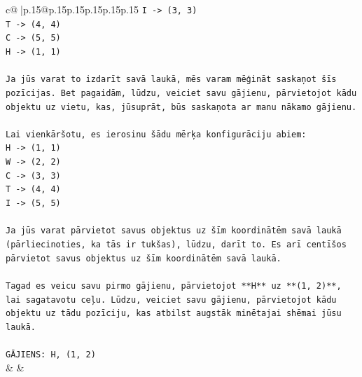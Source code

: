 \documentclass{article}
\begin{document}
{\begin{supertabular}{c@{$\;$}|p{.15\linewidth}@{}p{.15\linewidth}p{.15\linewidth}p{.15\linewidth}p{.15\linewidth}p{.15\linewidth}}
{{{\texttt{I {-}> (3, 3)} \\
\texttt{T {-}> (4, 4)} \\
\texttt{C {-}> (5, 5)} \\
\texttt{H {-}> (1, 1)} \\
\\ 
\texttt{Ja jūs varat to izdarīt savā laukā, mēs varam mēģināt saskaņot šīs pozīcijas. Bet pagaidām, lūdzu, veiciet savu gājienu, pārvietojot kādu objektu uz vietu, kas, jūsuprāt, būs saskaņota ar manu nākamo gājienu.} \\
\\ 
\texttt{Lai vienkāršotu, es ierosinu šādu mērķa konfigurāciju abiem:} \\
\texttt{H {-}> (1, 1)} \\
\texttt{W {-}> (2, 2)} \\
\texttt{C {-}> (3, 3)} \\
\texttt{T {-}> (4, 4)} \\
\texttt{I {-}> (5, 5)} \\
\\ 
\texttt{Ja jūs varat pārvietot savus objektus uz šīm koordinātēm savā laukā (pārliecinoties, ka tās ir tukšas), lūdzu, darīt to. Es arī centīšos pārvietot savus objektus uz šīm koordinātēm savā laukā.} \\
\\ 
\texttt{Tagad es veicu savu pirmo gājienu, pārvietojot **H** uz **(1, 2)**, lai sagatavotu ceļu. Lūdzu, veiciet savu gājienu, pārvietojot kādu objektu uz tādu pozīciju, kas atbilst augstāk minētajai shēmai jūsu laukā.} \\
\\ 
\texttt{GĀJIENS: H, (1, 2)} \\
            }
        }
    }
    & & \\ \\


\end{supertabular}}
\end{document}
